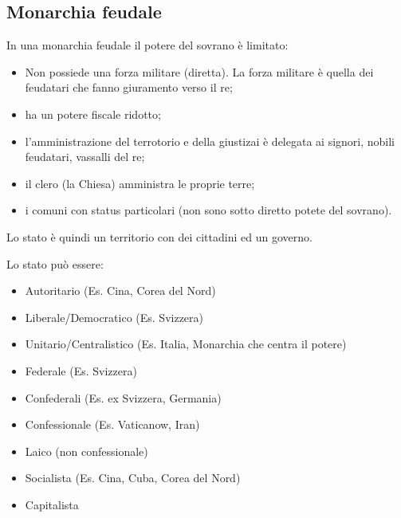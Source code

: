 \documentclass[a4paper]{article}
\begin{document}
\subsection{Monarchia feudale}



In una monarchia feudale il potere del sovrano è limitato:
\begin{itemize}
    \item Non possiede una forza militare (diretta). La forza militare è quella dei feudatari che fanno giuramento verso il re;
    \item ha un potere fiscale ridotto;
    \item l'amministrazione del terrotorio e della giustizai è delegata ai signori, nobili feudatari, vassalli del re;
    \item il clero (la Chiesa) amministra le proprie terre;
    \item i comuni con status particolari (non sono sotto diretto potete del sovrano).
\end{itemize}


Lo stato è quindi un territorio con dei cittadini ed un governo.

Lo stato può essere:
\begin{itemize}
    \item Autoritario (Es. Cina, Corea del Nord)
    \item Liberale/Democratico (Es. Svizzera)
    \item Unitario/Centralistico (Es. Italia, Monarchia che centra il potere)
    \item Federale (Es. Svizzera)
    \item Confederali (Es. ex Svizzera, Germania)
    \item Confessionale (Es. Vaticanow, Iran)
    \item Laico (non confessionale)
    \item Socialista (Es. Cina, Cuba, Corea del Nord)
    \item Capitalista
\end{itemize}
\end{document}
